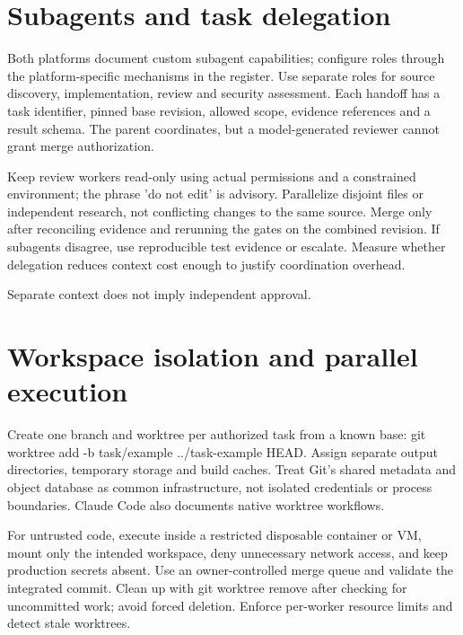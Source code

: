 \documentclass[11pt,letterpaper]{article}
\begin{document}
\section{Subagents and task delegation}
Both platforms document custom subagent capabilities; configure roles through the platform-specific mechanisms in the register. Use separate roles for source discovery, implementation, review and security assessment. Each handoff has a task identifier, pinned base revision, allowed scope, evidence references and a result schema. The parent coordinates, but a model-generated reviewer cannot grant merge authorization. \cite{cagents,osub}

Keep review workers read-only using actual permissions and a constrained environment; the phrase 'do not edit' is advisory. Parallelize disjoint files or independent research, not conflicting changes to the same source. Merge only after reconciling evidence and rerunning the gates on the combined revision. If subagents disagree, use reproducible test evidence or escalate. Measure whether delegation reduces context cost enough to justify coordination overhead.

\begin{center}\begin{minipage}{\linewidth}\captionsetup{type=figure}\centering{}\caption{Subagent delegation architecture}
\small Separate context does not imply independent approval.\end{minipage}\end{center}
\section{Workspace isolation and parallel execution}
Create one branch and worktree per authorized task from a known base: git worktree add -b task/example ../task-example HEAD. Assign separate output directories, temporary storage and build caches. Treat Git's shared metadata and object database as common infrastructure, not isolated credentials or process boundaries. Claude Code also documents native worktree workflows. \cite{cwork}

For untrusted code, execute inside a restricted disposable container or VM, mount only the intended workspace, deny unnecessary network access, and keep production secrets absent. Use an owner-controlled merge queue and validate the integrated commit. Clean up with git worktree remove after checking for uncommitted work; avoid forced deletion. Enforce per-worker resource limits and detect stale worktrees.
\end{document}
